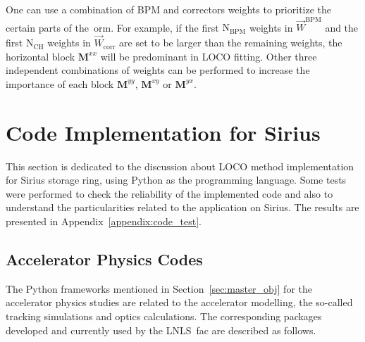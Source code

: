 One can use a combination of BPM and correctors weights to prioritize the certain parts of the~\gls{orm}. For example, if the first $\mathrm{N}_{\mathrm{BPM}}$ weights in $\vec{W}^{\mathrm{BPM}}$ and the first $\mathrm{N}_{\mathrm{CH}}$ weights in $\vec{W}_{\mathrm{corr}}$ are set to be larger than the remaining weights, the horizontal block $\mathbf{M}^{xx}$ will be predominant in LOCO fitting. Other three independent combinations of weights can be performed to increase the importance of each block $\mathbf{M}^{yy}$, $\mathbf{M}^{xy}$ or $\mathbf{M}^{yx}$.

\section{Code Implementation for Sirius}
This section is dedicated to the discussion about LOCO method implementation for Sirius storage ring, using Python as the programming language. Some tests were performed to check the reliability of the implemented code and also to understand the particularities related to the application on Sirius. The results are presented in Appendix~\ref{appendix:code_test}.

\subsection{Accelerator Physics Codes}
The Python frameworks mentioned in Section~\ref{sec:master_obj} for the accelerator physics studies are related to the accelerator modelling, the so-called tracking simulations and optics calculations. The corresponding packages developed and currently used by the LNLS~\gls{fac} are described as follows.

